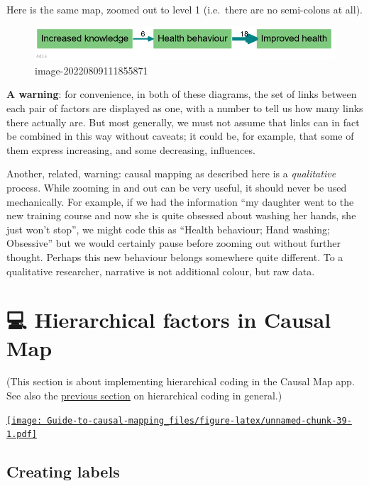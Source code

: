 \documentclass[
]{book}
\begin{document}
Here is the same map, zoomed out to level 1 (i.e.~there are no semi-colons at all).

\begin{figure}
\centering
\includegraphics[width=6.77083in,height=\textheight]{_assets/image-20220809111855871.png}
\caption{image-20220809111855871}
\end{figure}

\textbf{A warning}: for convenience, in both of these diagrams, the set of links between each pair of factors are displayed as one, with a number to tell us how many links there actually are. But most generally, we must not assume that links can in fact be combined in this way without caveats; it could be, for example, that some of them express increasing, and some decreasing, influences.

Another, related, warning: causal mapping as described here is a \emph{qualitative} process. While zooming in and out can be very useful, it should never be used mechanically. For example, if we had the information ``my daughter went to the new training course and now she is quite obsessed about washing her hands, she just won't stop'', we might code this as ``Health behaviour; Hand washing; Obsessive'' but we would certainly pause before zooming out without further thought. Perhaps this new behaviour belongs somewhere quite different. To a qualitative researcher, narrative is not additional colour, but raw data.

\hypertarget{xhierarchical-coding}{%
\chapter{💻 Hierarchical factors in Causal Map}\label{xhierarchical-coding}}

(This section is about implementing hierarchical coding in the Causal Map app. See also the \protect\hyperlink{xsimplifying-with-hierarchical}{previous section} on hierarchical coding in general.)

\href{https://player.vimeo.com/video/683770170}{\texttt{[image: Guide-to-causal-mapping\_files/figure-latex/unnamed-chunk-39-1.pdf]}}

\hypertarget{creating-labels}{%
\section{Creating labels}\label{creating-labels}}
\end{document}
